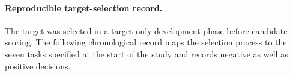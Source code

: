 
\paragraph{Reproducible target-selection record.}
The target was selected in a target-only development phase before candidate
scoring.  The following chronological record maps the selection process to the
seven tasks specified at the start of the study and records negative as well
as positive decisions.


